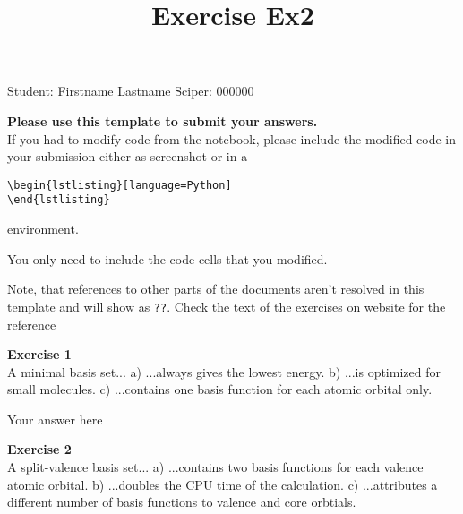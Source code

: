\documentclass{article}
\title{Exercise Ex2}
\begin{document}
\maketitle\maketitle

Student:  Firstname Lastname    Sciper: 000000

\begin{mdframed}
\textbf{Please use this template to submit your answers.}\\
If you had to modify code from the notebook, please include the modified code in your submission either as screenshot or in a

\begin{verbatim}
\begin{lstlisting}[language=Python]
\end{lstlisting}
\end{verbatim}

environment.

You only need to include the code cells that you modified.

Note, that references to other parts of the documents aren't resolved in this template and will show as \texttt{??}. Check the text of the exercises on website for the reference
\end{mdframed}

\begin{mdframed}
\textbf{Exercise 1}\\
A minimal basis set...\newline
a) ...always gives the lowest energy.\newline
b) ...is optimized for small molecules.\newline
c) ...contains one basis function for each atomic orbital only.
\end{mdframed}

Your answer here

\begin{mdframed}
\textbf{Exercise 2}\\
A split-valence basis set...\newline
a) ...contains two basis functions for each valence atomic orbital.\newline
b) ...doubles the CPU time of the calculation.\newline
c) ...attributes a different number of basis functions to valence and
core orbtials.
\end{mdframed}
\end{document}
